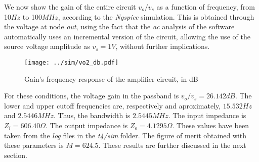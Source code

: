 \par We now show the gain of the entire circuit $v_o / v_s$ as a function of frequency, from 10$Hz$ to 100$MHz$, according to the \textit{Ngspice} simulation. This is obtained through the voltage at node \textit{out}, using the fact that the \textit{ac} analysis of the software automatically uses an incremental version of the circuit, allowing the use of the source voltage amplitude as $v_s = 1V$, without further implications.

\vspace{-2cm}
\begin{figure}[H]
\centering
  \texttt{[image: ../sim/vo2\_db.pdf]}
  \caption{Gain's frequency response of the amplifier circuit, in dB}
  \label{fig:gain_stage_gain(freq)}
\end{figure}

\par For these conditions, the voltage gain in the passband is $v_o/v_s = 26.142 dB$. The lower and upper cutoff frequencies are, respectively and aproximately, $15.532 Hz$ and $2.5446 MHz$. Thus, the bandwidth is $2.5445 MHz$. The input impedance is $Z_i=606.40\Omega$. The output impedance is $Z_o=4.1295 \Omega$. These values have been taken from the \textit{log} files in the \textit{t4/sim} folder. The figure of merit obtained with these parameters is $M=624.5$. These results are further discussed in the next section.

